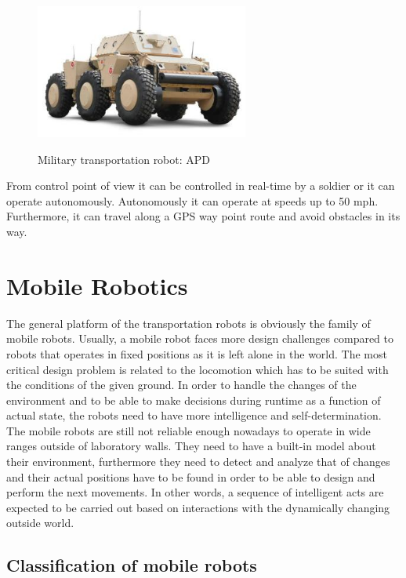 \documentclass[12pt,english,twoside]{article}
\begin{document}
\begin{figure}[h]
	\centering
	\includegraphics[width=7cm]{figures/apd.jpg}
	\label{bmw}
	\caption{Military transportation robot: APD}
\end{figure}

From control point of view it can be controlled in real-time by a soldier or it can operate autonomously. Autonomously it can operate at speeds up to 50 mph. Furthermore, it can travel along a GPS way point route and avoid obstacles in its way. \cite{apd}


\newpage

\section{Mobile Robotics}
The general platform of the transportation robots is obviously the family of mobile robots. Usually, a mobile robot faces more design challenges compared to robots that operates in fixed positions as it is left alone in the world. The most critical design problem is related to the locomotion which has to be suited with the conditions of the given ground. In order to handle the changes of the environment and to be able to make decisions during runtime as a function of actual state, the robots need to have more intelligence and self-determination. The mobile robots are still not reliable enough nowadays to operate in wide ranges outside of laboratory walls. They need to have a built-in model about their environment, furthermore they need to detect and analyze that of changes and their actual positions have to be found in order to be able to design and perform the next movements. In other words, a sequence of intelligent acts are expected to be carried out based on interactions with the dynamically changing outside world.
\subsection{Classification of mobile robots}
\end{document}
